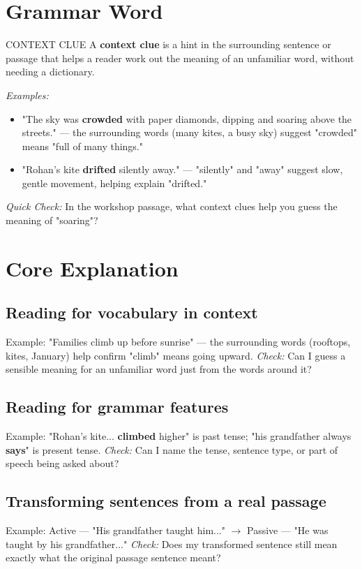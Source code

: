 \section{Grammar Word}
\begin{grammarword}{CONTEXT CLUE}
A \textbf{context clue} is a hint in the surrounding sentence or passage that helps a reader work out the meaning of an unfamiliar word, without needing a dictionary.

\textit{Examples:}
\begin{itemize}
    \item "The sky was \textbf{crowded} with paper diamonds, dipping and soaring above the streets." — the surrounding words (many kites, a busy sky) suggest "crowded" means "full of many things."
    \item "Rohan's kite \textbf{drifted} silently away." — "silently" and "away" suggest slow, gentle movement, helping explain "drifted."
\end{itemize}

\textit{Quick Check:} In the workshop passage, what context clues help you guess the meaning of "soaring"?
\end{grammarword}

\section{Core Explanation}
\subsection*{Reading for vocabulary in context}
Example: "Families climb up before sunrise" — the surrounding words (rooftops, kites, January) help confirm "climb" means going upward. \textit{Check:} Can I guess a sensible meaning for an unfamiliar word just from the words around it?

\subsection*{Reading for grammar features}
Example: "Rohan's kite... \textbf{climbed} higher" is past tense; "his grandfather always \textbf{says}" is present tense. \textit{Check:} Can I name the tense, sentence type, or part of speech being asked about?

\subsection*{Transforming sentences from a real passage}
Example: Active — "His grandfather taught him..." $\rightarrow$ Passive — "He was taught by his grandfather..." \textit{Check:} Does my transformed sentence still mean exactly what the original passage sentence meant?

